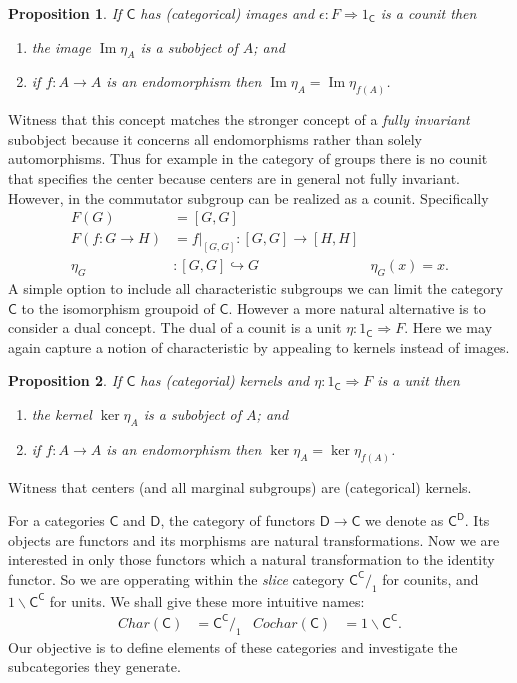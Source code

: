 \documentclass{amsart}
\newtheorem{prop}{Proposition}
\DeclareMathOperator{\im}{Im}
\begin{document}
\begin{prop}
    If $\mathsf{C}$ has (categorical) images and $\epsilon:F\Rightarrow
    1_{\mathsf{C}}$ is a counit then
\begin{enumerate}
    \item the image $\im\eta_A$ is a subobject of $A$; and
    \item if $f:A\to A$ is an endomorphism then $\im\eta_A=\im\eta_{f(A)}$.
\end{enumerate}
\end{prop}

Witness that this concept matches the stronger concept of a \emph{fully invariant}
subobject because it concerns all endomorphisms rather than solely automorphisms.
Thus for example in the category of groups there is no counit that specifies the 
center because centers are in general not fully invariant.  However, in the 
commutator subgroup can be realized as a counit.  Specifically 
\begin{align}
    F(G) & = [G,G] \\
    F(f:G\to H) & =f|_{[G,G]}:[G,G]\to [H,H] \\
    \eta_G &:[G,G]\hookrightarrow G & \eta_G(x)=x.
\end{align}
A simple option to include all characteristic subgroups we can limit the
category $\mathsf{C}$ to the isomorphism groupoid of $\mathsf{C}$. However a
more natural alternative is to consider a dual concept.  The dual of a counit is
a unit $\eta:1_{\mathsf{C}}\Rightarrow F$.  Here we may again capture a notion
of characteristic by appealing to kernels instead of images.

\begin{prop}
    If $\mathsf{C}$ has (categorial) kernels and $\eta:1_{\mathsf{C}}\Rightarrow
    F$ is a unit then
\begin{enumerate}
    \item the kernel $\ker\eta_A$ is a subobject of $A$; and
    \item if $f:A\to A$ is an endomorphism then $\ker \eta_A=\ker\eta_{f(A)}$.
\end{enumerate}
\end{prop}

Witness that centers (and all marginal subgroups) are (categorical) kernels.

For a categories $\mathsf{C}$ and $\mathsf{D}$, the category of functors
$\mathsf{D}\to \mathsf{C}$ we denote as $\mathsf{C}^{\mathsf{D}}$.  Its objects
are functors and its morphisms are natural transformations.  Now we are interested 
in only those functors which a natural transformation to the identity functor.  
So we are opperating within the \emph{slice} category $\mathsf{C}^{\mathsf{C}}/_1$
for counits, and $1\backslash \mathsf{C}^{\mathsf{C}}$ for units.  We shall give these 
more intuitive names:
\begin{align}
    Char(\mathsf{C}) & = \mathsf{C}^{\mathsf{C}}/_1 & 
    Cochar(\mathsf{C}) & = 1\backslash \mathsf{C}^{\mathsf{C}}.
\end{align}
Our objective is to define elements of these categories and investigate the
subcategories they generate.
\end{document}
